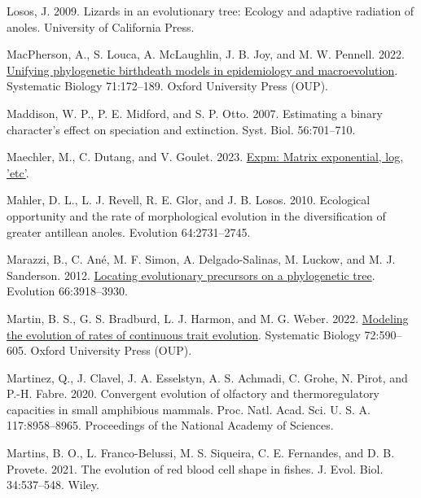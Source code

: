 \documentclass[fleqn,10pt,lineno]{wlpeerj} %
\newlength{\cslhangindent}
\newlength{\cslentryspacingunit} %
\newenvironment{CSLReferences}[2] %
 {%
  \setlength{\parindent}{0pt}
  \ifodd #1
  \let\oldpar\par
  \def\par{\hangindent=\cslhangindent\oldpar}
  \fi
  \setlength{\parskip}{#2\cslentryspacingunit}
 }%
 {}
\begin{document}
\begin{CSLReferences}{1}{0}
\leavevmode{}%
Losos, J. 2009. Lizards in an evolutionary tree: Ecology and adaptive radiation of anoles. University of California Press.

\leavevmode{}%
MacPherson, A., S. Louca, A. McLaughlin, J. B. Joy, and M. W. Pennell. 2022. \href{https://doi.org/10.1093/sysbio/syab049}{Unifying phylogenetic birth{\textendash}death models in epidemiology and macroevolution}. Systematic Biology 71:172--189. Oxford University Press ({OUP}).

\leavevmode{}%
Maddison, W. P., P. E. Midford, and S. P. Otto. 2007. Estimating a binary character's effect on speciation and extinction. Syst. Biol. 56:701--710.

\leavevmode{}%
Maechler, M., C. Dutang, and V. Goulet. 2023. \href{https://CRAN.R-project.org/package=expm}{Expm: Matrix exponential, log, 'etc'}.

\leavevmode{}%
Mahler, D. L., L. J. Revell, R. E. Glor, and J. B. Losos. 2010. Ecological opportunity and the rate of morphological evolution in the diversification of greater antillean anoles. Evolution 64:2731--2745.

\leavevmode{}%
Marazzi, B., C. Ané, M. F. Simon, A. Delgado-Salinas, M. Luckow, and M. J. Sanderson. 2012. \href{https://doi.org/10.1111/j.1558-5646.2012.01720.x}{Locating evolutionary precursors on a phylogenetic tree}. Evolution 66:3918--3930.

\leavevmode{}%
Martin, B. S., G. S. Bradburd, L. J. Harmon, and M. G. Weber. 2022. \href{https://doi.org/10.1093/sysbio/syac068}{Modeling the evolution of rates of continuous trait evolution}. Systematic Biology 72:590--605. Oxford University Press ({OUP}).

\leavevmode{}%
Martinez, Q., J. Clavel, J. A. Esselstyn, A. S. Achmadi, C. Grohe, N. Pirot, and P.-H. Fabre. 2020. Convergent evolution of olfactory and thermoregulatory capacities in small amphibious mammals. Proc. Natl. Acad. Sci. U. S. A. 117:8958--8965. Proceedings of the National Academy of Sciences.

\leavevmode{}%
Martins, B. O., L. Franco-Belussi, M. S. Siqueira, C. E. Fernandes, and D. B. Provete. 2021. The evolution of red blood cell shape in fishes. J. Evol. Biol. 34:537--548. Wiley.


\end{CSLReferences}
\end{document}
